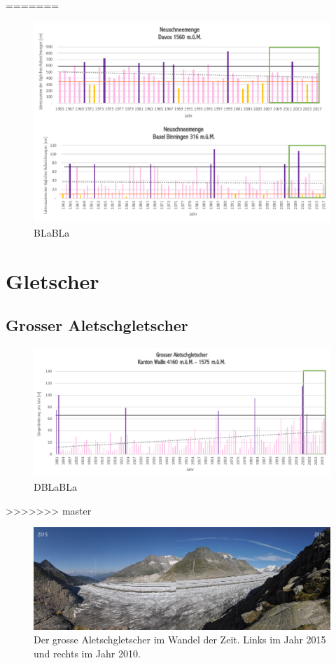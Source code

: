 \begin{refsection}
=======
\begin{figure}[htbp]
\centering
\includegraphics[width=1.0\textwidth]{extrem/Neuschnee.pdf}
\caption{BLaBLa}
\label{Neuschnee}
\end{figure}


\section{Gletscher}


\subsection{Grosser Aletschgletscher}

\begin{figure}[htbp]
\centering
\includegraphics[width=1.0\textwidth]{extrem/Aletsch.pdf}
\caption{DBLaBLa}
\label{AletschTab}
\end{figure}

>>>>>>> master

\begin{figure}[htbp]
\centering
\includegraphics[width=1.0\textwidth]{extrem/Aletsch.jpg}
\caption{Der grosse Aletschgletscher im Wandel der Zeit. Links im Jahr 2015 und rechts im Jahr 2010.}
\label{Aletsch}
\end{figure}


\end{refsection}
